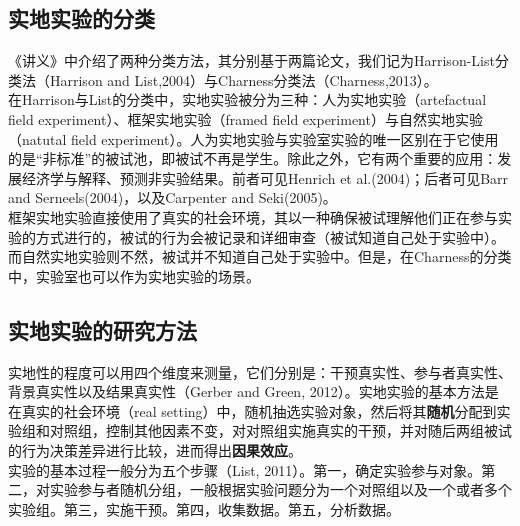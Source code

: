 \documentclass[a4paper]{article}
\begin{document}
	\subsection{实地实验的分类}
	《讲义》中介绍了两种分类方法，其分别基于两篇论文，我们记为Harrison-List分类法（Harrison and List,2004）与Charness分类法（Charness,2013）。
	\\[3pt]
	\indent
	在Harrison与List的分类中，实地实验被分为三种：人为实地实验（artefactual field experiment）、框架实地实验（framed field experiment）与自然实地实验（natutal field experiment）。人为实地实验与实验室实验的唯一区别在于它使用的是“非标准”的被试池，即被试不再是学生。除此之外，它有两个重要的应用：发展经济学与解释、预测非实验结果。前者可见Henrich et al.(2004)；后者可见Barr and Serneels(2004)，以及Carpenter and Seki(2005)。
	\\[3pt]
	\indent
	框架实地实验直接使用了真实的社会环境，其以一种确保被试理解他们正在参与实验的方式进行的，被试的行为会被记录和详细审查（被试知道自己处于实验中）。而自然实地实验则不然，被试并不知道自己处于实验中。但是，在Charness的分类中，实验室也可以作为实地实验的场景。

	
	\subsection{实地实验的研究方法}
	实地性的程度可以用四个维度来测量，它们分别是：干预真实性、参与者真实性、背景真实性以及结果真实性（Gerber and Green, 2012）。实地实验的基本方法是在真实的社会环境（real setting）中，随机抽选实验对象，然后将其\textbf{随机}分配到实验组和对照组，控制其他因素不变，对对照组实施真实的干预，并对随后两组被试的行为决策差异进行比较，进而得出\textbf{因果效应}。
	\\[3pt]
	\indent
	实验的基本过程一般分为五个步骤（List, 2011）。第一，确定实验参与对象。第二，对实验参与者随机分组，一般根据实验问题分为一个对照组以及一个或者多个实验组。第三，实施干预。第四，收集数据。第五，分析数据。
	
\end{document}
